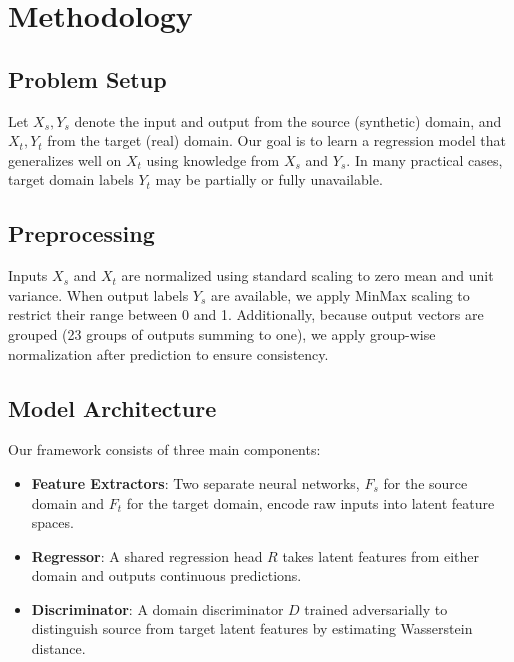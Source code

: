 \documentclass{article}
\begin{document}
\section{Methodology}

\subsection{Problem Setup}
Let $X_s, Y_s$ denote the input and output from the source (synthetic) domain, and $X_t, Y_t$ from the target (real) domain. Our goal is to learn a regression model that generalizes well on $X_t$ using knowledge from $X_s$ and $Y_s$. In many practical cases, target domain labels $Y_t$ may be partially or fully unavailable.

\subsection{Preprocessing}
Inputs $X_s$ and $X_t$ are normalized using standard scaling to zero mean and unit variance. When output labels $Y_s$ are available, we apply MinMax scaling to restrict their range between 0 and 1. Additionally, because output vectors are grouped (23 groups of outputs summing to one), we apply group-wise normalization after prediction to ensure consistency.

\subsection{Model Architecture}
Our framework consists of three main components:
\begin{itemize}
  \item \textbf{Feature Extractors}: Two separate neural networks, $F_s$ for the source domain and $F_t$ for the target domain, encode raw inputs into latent feature spaces.
  \item \textbf{Regressor}: A shared regression head $R$ takes latent features from either domain and outputs continuous predictions.
  \item \textbf{Discriminator}: A domain discriminator $D$ trained adversarially to distinguish source from target latent features by estimating Wasserstein distance.
\end{itemize}
\end{document}
